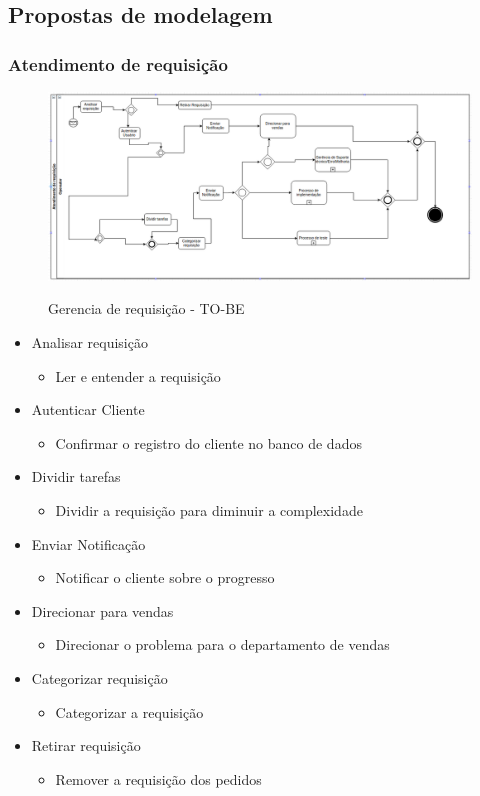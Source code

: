 \subsection{Propostas de modelagem}
\subsubsection{Atendimento de requisição }
\begin{figure}[!h]
\caption{Gerencia de requisição - TO-BE}
\centering %
\includegraphics[width=15cm]{to_be/01_atendimento_de_requisicao.png}
\label{figura:atendimento_requisicao_to_be}
\end{figure}

\begin{itemize}[noitemsep]
	\item Analisar requisição
		\begin{itemize}
			\item Ler e entender a requisição
		\end{itemize}
	\item Autenticar Cliente
		\begin{itemize}
			\item Confirmar o registro do cliente no banco de dados
		\end{itemize}
	\item Dividir tarefas
		\begin{itemize}
			\item Dividir a requisição para diminuir a complexidade
		\end{itemize}
	\item Enviar Notificação
		\begin{itemize}
			\item Notificar o cliente sobre o progresso
		\end{itemize}
	\item Direcionar para vendas
		\begin{itemize}
			\item Direcionar o problema para o departamento de vendas
		\end{itemize}
	\item Categorizar requisição
		\begin{itemize}
			\item Categorizar a requisição
		\end{itemize}
	\item Retirar requisição
		\begin{itemize}
			\item Remover a requisição dos pedidos
		\end{itemize}
\end{itemize}

